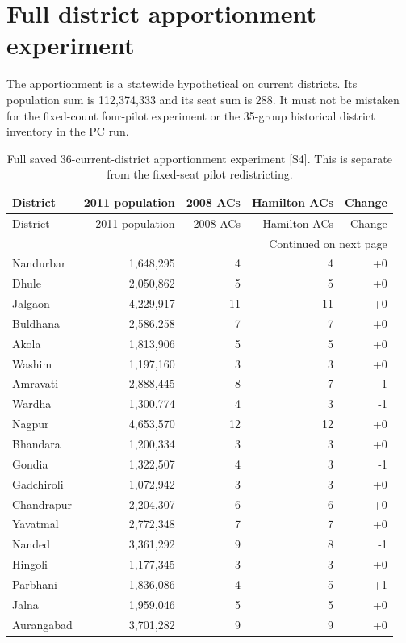 \documentclass[11pt,a4paper,oneside]{report}
\begin{document}
\chapter{Full district apportionment experiment}\label{app:allocation}
The apportionment is a statewide hypothetical on current districts. Its population sum is 112,374,333 and its seat sum is 288. It must not be mistaken for the fixed-count four-pilot experiment or the 35-group historical district inventory in the PC run.
\begin{center}
\small
\setlength{\tabcolsep}{5pt}
\begin{longtable}{lrrrr}
\caption{Full saved 36-current-district apportionment experiment [S4]. This is separate from the fixed-seat pilot redistricting.}\\
\toprule
District & 2011 population & 2008 ACs & Hamilton ACs & Change\\
\midrule\endfirsthead
\toprule
District & 2011 population & 2008 ACs & Hamilton ACs & Change\\
\midrule\endhead
\midrule\multicolumn{5}{r}{\footnotesize Continued on next page}\\\endfoot
\bottomrule\endlastfoot
Nandurbar & 1,648,295 & 4 & 4 & +0\\
Dhule & 2,050,862 & 5 & 5 & +0\\
Jalgaon & 4,229,917 & 11 & 11 & +0\\
Buldhana & 2,586,258 & 7 & 7 & +0\\
Akola & 1,813,906 & 5 & 5 & +0\\
Washim & 1,197,160 & 3 & 3 & +0\\
Amravati & 2,888,445 & 8 & 7 & -1\\
Wardha & 1,300,774 & 4 & 3 & -1\\
Nagpur & 4,653,570 & 12 & 12 & +0\\
Bhandara & 1,200,334 & 3 & 3 & +0\\
Gondia & 1,322,507 & 4 & 3 & -1\\
Gadchiroli & 1,072,942 & 3 & 3 & +0\\
Chandrapur & 2,204,307 & 6 & 6 & +0\\
Yavatmal & 2,772,348 & 7 & 7 & +0\\
Nanded & 3,361,292 & 9 & 8 & -1\\
Hingoli & 1,177,345 & 3 & 3 & +0\\
Parbhani & 1,836,086 & 4 & 5 & +1\\
Jalna & 1,959,046 & 5 & 5 & +0\\
Aurangabad & 3,701,282 & 9 & 9 & +0\\

\end{longtable}
\end{center}
\end{document}
